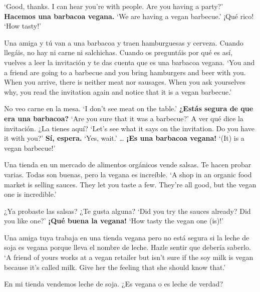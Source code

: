 \begin{exe}
\begin{xlist}[A:]
	\glt `Good, thanks. I can hear you're with people. Are you having a party?' 
	 \textbf{Hacemos una barbacoa vegana.} 
	\glt `We are having a vegan barbecue.' 
	 ¡Qué rico! \href{https://osf.io/34n76/}{\faVolumeUp}
	\glt `How tasty!' 
	\end{xlist}
\ex \label{ex:experimentoMIRDECLvegana_APP}
	Una amiga y tú van a una barbacoa y traen hamburguesas y cerveza. Cuando llegáis, no hay ni carne ni salchichas. Cuando os preguntáis por qué es así, vuelves a leer la invitación y te das cuenta que es una barbacoa vegana.  
	\glt `You and a friend are going to a barbecue and you bring hamburgers and beer with you. When you arrive, there is neither meat nor sausages. When you ask yourselves why, you read the invitation again and notice that it is a vegan barbecue.' 
	\begin{xlist}[A:]
	 No veo carne en la mesa. \href{https://osf.io/hb5ty/}{\faVolumeUp}
	\glt `I don't see meat on the table.' 
	 \textbf{¿Estás segura de que era una barbacoa?} 
	\glt `Are you sure that it was a barbecue?' 
	 A ver qué dice la invitación. ¿La tienes aquí? \href{https://osf.io/dth58/}{\faVolumeUp}
	\glt `Let's see what it says on the invitation. Do you have it with you?' 
	 \textbf{Sí, espera.} 
	\glt `Yes, wait.' 
	\exi {} \ldots  
	 \textbf{¡Es una barbacoa vegana!} 
	\glt `(It) is a vegan barbecue!' 
	\end{xlist}
\ex \label{ex:experimentoWHEXCLvegana_APP}
	Una tienda en un mercado de alimentos orgánicos vende salsas. Te hacen probar varias. Todas son buenas, pero la vegana es increíble. 
	\glt `A shop in an organic food market is selling sauces. They let you taste a few. They're all good, but the vegan one is incredible.' 
	\begin{xlist}[A:]
	 ¿Ya probaste las salsas? ¿Te gusta alguna? \href{https://osf.io/c6qgx/}{\faVolumeUp} 
	\glt `Did you try the sauces already? Did you like one?' 
	 \textbf{¡Qué buena la vegana!} 
	\glt `How tasty the vegan one (is)!' 
	\end{xlist}
\ex \label{ex:experimentoOBVDECLvegana_APP}
	Una amiga tuya trabaja en una tienda vegana pero no está segura si la leche de soja es vegana porque lleva el nombre de leche. Hazle sentir que debería saberlo. 
	\glt `A friend of yours works at a vegan retailer but isn't sure if the soy milk is vegan because it's called milk. Give her the feeling that she should know that.' 
	\begin{xlist}[A:]
	 En mi tienda vendemos leche de soja. ¿Es vegana o es leche de verdad? \href{https://osf.io/c5f26/}{\faVolumeUp}

\end{xlist}
\end{exe}

